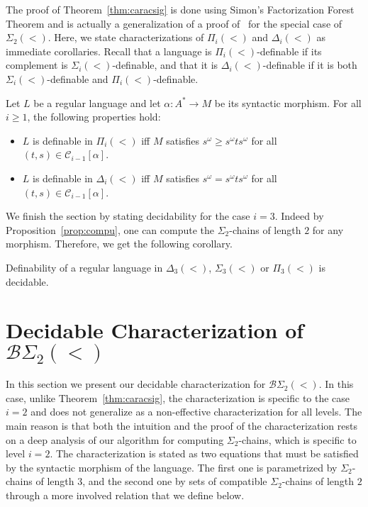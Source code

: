 \documentclass[envcountsame]{llncs}
\newcommand\Cs{\ensuremath{\mathcal{C}}\xspace}
\newcommand\Cslev[1]{\ensuremath{\Cs_{#1}}\xspace}
\newcommand{\dew}[1]{\ensuremath{\Delta_{#1}(<)}\xspace}
\newcommand{\sic}[1]{\ensuremath{\Sigma_{#1}}\xspace}
\newcommand{\siw}[1]{\ensuremath{\Sigma_{#1}(<)}\xspace}
\newcommand{\piw}[1]{\ensuremath{\Pi_{#1}(<)}\xspace}
\newcommand{\siwd}{\ensuremath{\Sigma_{2}(<)}\xspace}
\newcommand{\bswd}{\ensuremath{\mathcal{B}\Sigma_{2}(<)}\xspace}
\newcommand{\dewt}{\ensuremath{\Delta_{3}(<)}\xspace}
\newcommand{\siwt}{\ensuremath{\Sigma_{3}(<)}\xspace}
\newcommand{\piwt}{\ensuremath{\Pi_{3}(<)}\xspace}
\newcommand\gmo{\ensuremath{\geqslant}\xspace}
\newcommand\qchains[1]{\ensuremath{\sic{#1}}-chains\xspace}
\newcommand\dchains{\qchains{2}}
\begin{document}
The proof of Theorem~\ref{thm:caracsig} is done using Simon's
Factorization Forest Theorem and is actually a generalization of a
proof of~\cite{bfacto} for the special case of \siwd. Here, we state characterizations of \piw{i}
and \dew{i} as immediate corollaries. Recall that a language is
\piw{i}-definable if its complement is \siw{i}-definable, and that
it is \dew{i}-definable if it is both \siw{i}-definable and
\piw{i}-definable. 

\begin{corollary} \label{cor:caracpi}
  Let $L$ be a regular language and let $\alpha: A^* \rightarrow M$ be its
  syntactic morphism. For all $i \gmo 1$, the following properties hold:
  \begin{itemize}
  \item $L$ is definable in \piw{i} iff $M$ satisfies $s^{\omega}
    \gmo s^{\omega}ts^{\omega}$ for all $(t,s) \in \Cslev{i-1}[\alpha]$.
  \item $L$ is definable in \dew{i} iff $M$ satisfies $s^{\omega}
    = s^{\omega}ts^{\omega}$ for all $(t,s) \in \Cslev{i-1}[\alpha]$.
  \end{itemize}
\end{corollary}

We finish the section by stating decidability for the case $i=3$.
Indeed by Proposition~\ref{prop:compu}, one can compute the \dchains
of length $2$ for any morphism. Therefore, we get the following
corollary.

\begin{corollary} \label{cor:decid}  
  Definability of a regular language in \dewt, \siwt or \piwt is decidable.
\end{corollary}


\section{Decidable Characterization of \bswd}
\label{sec:caracbc}
In this section we present our decidable characterization for
\bswd. In this case, unlike Theorem~\ref{thm:caracsig}, the
characterization is specific to the case $i=2$ and does not generalize
as a non-effective characterization for all levels. The main reason is
that both the intuition and the proof of the characterization rests on
a deep analysis of our algorithm for computing \dchains, which is
specific to level $i = 2$. The characterization is stated as two
equations that must be satisfied by the syntactic morphism of the
language. The first one is parametrized by \dchains of length $3$, and
the second one by sets of compatible \dchains of length $2$ through a
more involved relation that we define below.
\end{document}
